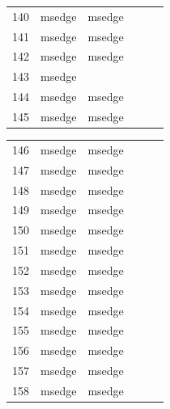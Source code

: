 \documentclass[a4paper,twoside,12pt]{book}
\begin{document}
\begin{appendices}
\begin{table}
\begin{tabular}{l|l|l|l|l|l}
		140 &  msedge &         msedge &                &                &                \\
		141 &  msedge &         msedge &                &                &                \\
		142 &  msedge &         msedge &                &                &                \\
		143 &  msedge &                &                &                &                \\
		144 &  msedge &         msedge &                &                &                \\
		145 &  msedge &         msedge &                &                &                \\
		\bottomrule
	\end{tabular}		
\end{table}
\begin{table}
	\centering
	\begin{tabular}{l|l|l|l|l|l}
		\toprule
		146 &  msedge &         msedge &                &                &                \\
		147 &  msedge &         msedge &                &                &                \\
		148 &  msedge &         msedge &                &                &                \\
		149 &  msedge &         msedge &                &                &                \\
		150 &  msedge &         msedge &                &                &                \\
		151 &  msedge &         msedge &                &                &                \\
		152 &  msedge &         msedge &                &                &                \\
		153 &  msedge &         msedge &                &                &                \\
		154 &  msedge &         msedge &                &                &                \\
		155 &  msedge &         msedge &                &                &                \\
		156 &  msedge &         msedge &                &                &                \\
		157 &  msedge &         msedge &                &                &                \\
		158 &  msedge &         msedge &                &                &                \\

\end{tabular}
\end{table}
\end{appendices}
\end{document}
